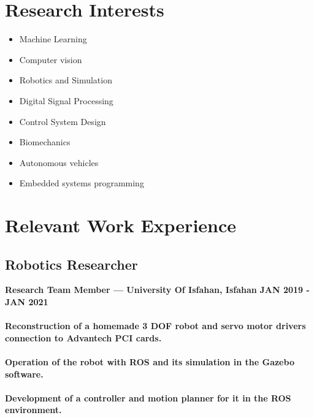 \documentclass[a4paper]{article}
\begin{document}
    \section{Research Interests}


        \begin{multicols}{2}[]
            \begin{itemize}
                \itemsep0em 
                \item Machine Learning
                \item Computer vision
                \item Robotics and Simulation
                \item Digital Signal Processing
                \item Control System Design
                \item Biomechanics
                \item Autonomous vehicles
                \item Embedded systems programming
            \end{itemize}
        \end{multicols}

    \section{Relevant Work Experience}
        \subsection{Robotics Researcher}
        {\bfseries\small Research Team Member — University Of Isfahan, Isfahan}
        \hfill
        {\bfseries\small JAN 2019 - JAN 2021}

        \paragraph{Reconstruction of a homemade 3 DOF robot and servo motor drivers connection to Advantech PCI cards.}
        \paragraph{Operation of the robot with ROS and its simulation in the Gazebo software.}
        \paragraph{Development of a controller and motion planner for it in the ROS environment.}
\end{document}

